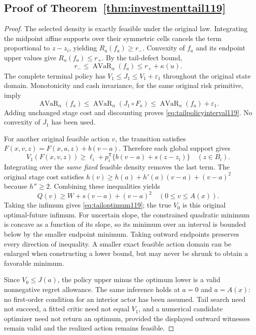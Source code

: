 \subsection{Proof of Theorem~\ref{thm:investmenttail119}}
\begin{proof}
The selected density is exactly feasible under the original law.
Integrating the midpoint affine supports over their symmetric cells
cancels the term proportional to $z-z_i$, yielding
$R_u(f_a)\ge r_-$.  Convexity of $f_a$ and its endpoint upper
values give $R_u(f_a)\le r_+$.  By the tail-defect bound,
\[
 r_-\le\operatorname{AVaR}_\alpha(f_a)
                 \le r_++\kappa(u).
\]
The complete terminal policy has
$V_1\le J_1\le V_1+\varepsilon_1$ throughout the original state
domain.  Monotonicity and cash invariance, for the same original
risk primitive, imply
\[
 \operatorname{AVaR}_\alpha(f_a)
 \le\operatorname{AVaR}_\alpha(J_1\circ F_a)
 \le\operatorname{AVaR}_\alpha(f_a)+\varepsilon_1.
\]
Adding unchanged stage cost and discounting proves
\eqref{eq:tailpolicyinterval119}.  No convexity of $J_1$ has been used.

For another original feasible action $v$, the transition satisfies
$F(x,v,z)=F(x,a,z)+b(v-a)$.  Therefore each global support gives
\[
 V_1(F(x,v,z))
 \ge\ell_i+p_i^{\mathsf T}\{b(v-a)+s(z-z_i)\}
 \quad(z\in B_i).
\]
Integrating over the \emph{same fixed} feasible density removes the
last term.  The original stage cost satisfies
$h(v)\ge h(a)+h'(a)(v-a)+(v-a)^2$ because $h''\ge2$.
Combining these inequalities yields
\[
 Q(v)\ge W+s(v-a)+(v-a)^2
 \quad(0\le v\le A(x)).
\]
Taking the infimum gives \eqref{eq:tailoptimum119}; the true
$V_0$ is this original optimal-future infimum.  For uncertain slope,
the constrained quadratic minimum is concave as a function of its
slope, so its minimum over an interval is bounded below by the
smaller endpoint minimum.  Taking outward endpoints preserves every
direction of inequality.  A smaller exact feasible action domain can
be enlarged when constructing a lower bound, but may never be shrunk
to obtain a favorable minimum.

Since $V_0\le J(a)$, the policy upper minus the optimum lower is
a valid nonnegative regret allowance.  The same inference holds at
$a=0$ and $a=A(x)$: no first-order condition for an interior actor
has been assumed.  Tail search need not succeed, a fitted critic
need not equal $V_1$, and a numerical candidate optimizer need not
return an optimum, provided the displayed outward witnesses remain
valid and the realized action remains feasible.
\end{proof}

